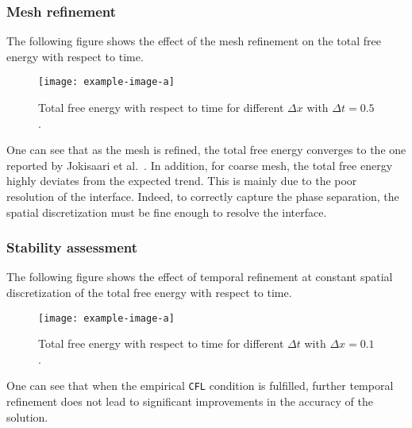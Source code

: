     \subsubsection{Mesh refinement}
    The following figure shows the effect of the mesh refinement on the total free energy with respect to time.
    \begin{figure}[H]
        \centering
        \texttt{[image: example-image-a]}
        \caption{Total free energy with respect to time for different $\Delta x$ with $\Delta t = 0.5$.}
        \label{fig:ftot_dx}
    \end{figure}
    One can see that as the mesh is refined, the total free energy converges to the one reported by Jokisaari et al.\ \cite{JokisaariVoorheesGuyerWarrenHeinonen2017}. In addition, for coarse mesh, the total free energy highly deviates from the expected trend. This is mainly due to the poor resolution of the interface. Indeed, to correctly capture the phase separation, the spatial discretization must be fine enough to resolve the interface.
    \subsubsection{Stability assessment}
    The following figure shows the effect of temporal refinement at constant spatial discretization
    of the total free energy with respect to time.
    \begin{figure}[H]
        \centering
        \texttt{[image: example-image-a]}
        \caption{Total free energy with respect to time for different $\Delta t$ with $\Delta x=0.1$.}
        \label{fig:ftot_dt}
    \end{figure}
    One can see that when the empirical \texttt{CFL} condition is fulfilled, further temporal refinement does not lead to significant improvements in the accuracy of the solution.

